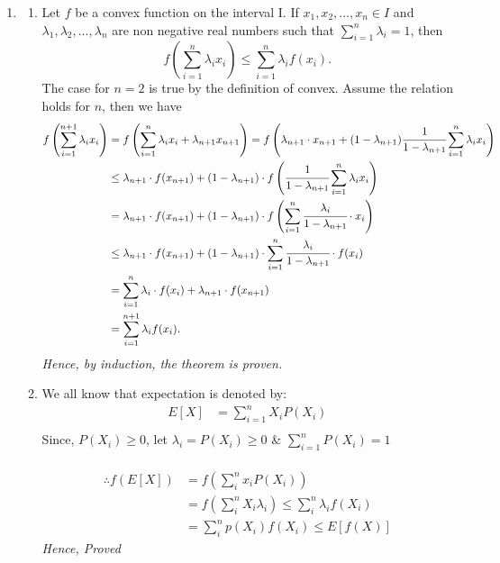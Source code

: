 \documentclass{article}
\begin{document}
\begin{enumerate}
\newpage
\item 
    \begin{enumerate}
    \item 
        Let \(f\) be a convex function on the interval I. If \(x_1, x_2, \ldots, x_n \in I\) and \(\lambda_1, \lambda_2, \ldots, \lambda_n\) are non negative real numbers such that \(\sum_{i=1}^{n} \lambda_i = 1\), then
        \[
            f\left(\sum_{i=1}^{n} \lambda_i x_i\right) \leq \sum_{i=1}^{n} \lambda_i f(x_i).
        \]
        The case for \(n = 2\) is true by the definition of convex. Assume the relation holds for \(n\), then we have
        \begin{align*}
            f\left(\sum_{i=1}^{n+1} \lambda_i x_i\right) &= f\left(\sum_{i=1}^{n} \lambda_i x_i + \lambda_{n+1}x_{n+1}\right)
            = f\left(\lambda_{n+1}\cdot x_{n+1} + (1 - \lambda_{n+1}) \cfrac{1}{1 - \lambda_{n+1}}\sum_{i=1}^{n} \lambda_i x_i\right)\\
            &\leq \lambda_{n+1}\cdot f(x_{n+1}) + (1 - \lambda_{n+1})\cdot f\left(\cfrac{1}{1 - \lambda_{n+1}}\sum_{i=1}^{n} \lambda_i x_i\right)\\
            &= \lambda_{n+1}\cdot f(x_{n+1}) + (1 - \lambda_{n+1})\cdot f\left(\sum_{i=1}^{n} \cfrac{\lambda_i}{1 - \lambda_{n+1}}\cdot x_i\right)\\
            &\leq \lambda_{n+1}\cdot f(x_{n+1}) + (1 - \lambda_{n+1})\cdot \sum_{i=1}^{n} \cfrac{\lambda_i}{1 - \lambda_{n+1}}\cdot f(x_i)\\
            &= \sum_{i=1}^{n} \lambda_i\cdot f(x_i) + \lambda_{n+1}\cdot f(x_{n+1})\\
            &= \sum_{i=1}^{n+1} \lambda_i f(x_i).
        \end{align*} 
        \textit{Hence, by induction, the theorem is proven.}\\
    \item 
        We all know that expectation is denoted by:
        \begin{align*}
            E[X] &= \sum_{i=1}^{n} X_i P(X_i) \\
        \end{align*}
        Since, \(P(X_i)\geq 0\), let \(\lambda_i = P(X_i)\geq 0\) \& \(\sum_{i=1}^{n} P(X_i) = 1\)\\\\
        \begin{align*}
            \therefore 
            f(E[X]) &= f\left(\sum_{i}^{n}x_i P(X_i)\right)\\
            &= f\left(\sum_{i}^{n}X_i \lambda_i\right) \leq \sum_{i}^{n}\lambda_i f(X_i)\\
            &= \sum_{i}^{n}p(X_i) f(X_i)\leq E[f(X)]
        \end{align*}
        \textit{Hence, Proved}
    \end{enumerate}


\end{enumerate}
\end{document}
